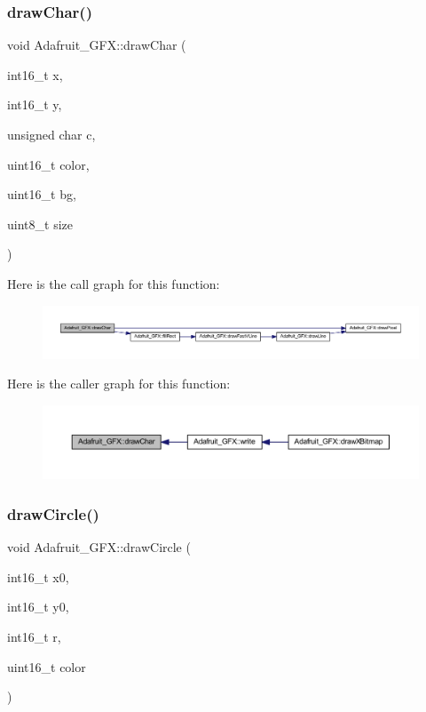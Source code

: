 \subsubsection{\texorpdfstring{draw\+Char()}{drawChar()}}
{\footnotesize\ttfamily void Adafruit\+\_\+\+G\+F\+X\+::draw\+Char (\begin{DoxyParamCaption}\item[{int16\+\_\+t}]{x,  }\item[{int16\+\_\+t}]{y,  }\item[{unsigned char}]{c,  }\item[{uint16\+\_\+t}]{color,  }\item[{uint16\+\_\+t}]{bg,  }\item[{uint8\+\_\+t}]{size }\end{DoxyParamCaption})}

Here is the call graph for this function\+:\nopagebreak
\begin{figure}[H]
\begin{center}
\leavevmode
\includegraphics[width=350pt]{class_adafruit___g_f_x_ab7f5a29b3a3dffe30c6a3f4c1f604a5a_cgraph}
\end{center}
\end{figure}
Here is the caller graph for this function\+:\nopagebreak
\begin{figure}[H]
\begin{center}
\leavevmode
\includegraphics[width=350pt]{class_adafruit___g_f_x_ab7f5a29b3a3dffe30c6a3f4c1f604a5a_icgraph}
\end{center}
\end{figure}
\mbox{\label{class_adafruit___g_f_x_a648d2d6765e488b4556e802167d885fb}} 
\subsubsection{\texorpdfstring{draw\+Circle()}{drawCircle()}}
{\footnotesize\ttfamily void Adafruit\+\_\+\+G\+F\+X\+::draw\+Circle (\begin{DoxyParamCaption}\item[{int16\+\_\+t}]{x0,  }\item[{int16\+\_\+t}]{y0,  }\item[{int16\+\_\+t}]{r,  }\item[{uint16\+\_\+t}]{color }\end{DoxyParamCaption})}

